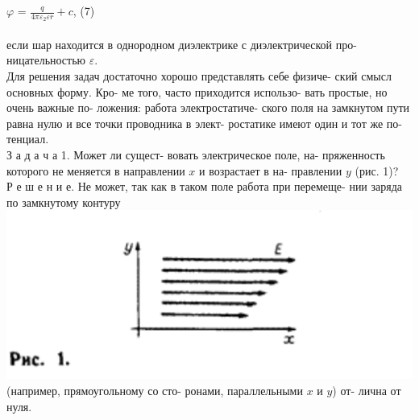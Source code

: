 \documentclass{memoir}
\begin{document}
\begin{multicols}{2}
\begin{small}
\begin{justify}
	\parindent50pt
\indent $\varphi$ = $\frac{q}{4 \pi \varepsilon_2 \varepsilon r} + c$, \hfill (7) \\\\
если шар находится в однородном\linebreak
диэлектрике с диэлектрической про-\linebreak
ницательностью $\varepsilon$. \\
\parindent20pt
\indent Для решения задач достаточно\linebreak
хорошо представлять себе физиче-\linebreak
ский смысл основных форму. Кро-\linebreak
ме того, часто приходится использо-\linebreak
вать простые, но очень важные по-\linebreak
ложения: работа электростатиче-\linebreak
ского поля на замкнутом пути равна\linebreak
нулю и все точки проводника в элект-\linebreak
ростатике имеют один и тот же по-\linebreak
тенциал. \\
\indent З а д а ч а 1. Может ли сущест-\linebreak
вовать электрическое поле, на-\linebreak
пряженность которого не меняется\linebreak
в направлении $x$ и возрастает в на-\linebreak
правлении $y$ (рис. 1)? \\

\indent Р е ш е н и е. Не может, так как\linebreak
в таком поле работа при перемеще-\linebreak
нии заряда по замкнутому контуру \\

\includegraphics[scale=0.45]{pic1.png}\linebreak
(например, прямоугольному со сто-\linebreak
ронами, параллельными $x$ и $y$) от-\linebreak
лична от нуля. \\


\end{justify}
\end{small}
\end{multicols}
\end{document}
